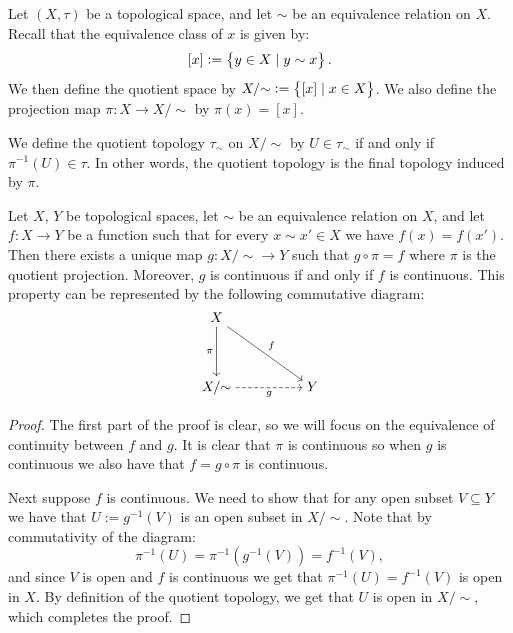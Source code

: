 \documentclass[11pt,a4paper]{article}
\begin{document}
\begin{definition}
  Let $(X, \tau)$ be a topological space, and let $\sim$ be an equivalence
  relation on $X$.
  Recall that the equivalence class of $x$ is given by:
  \[
    [x] := \left\{y \in X \mid y \sim x\right\}.
  \]
  We then define the quotient space by $X/{\sim} := \left\{[x] \mid x \in X\right\}$.
  We also define the projection map $\pi \colon X \to {X}/{\sim}$ by
  $\pi(x) = [x]$.
\end{definition}

\begin{definition}
  We define the quotient topology $\tau_{\sim}$ on ${X} / {\sim}$
  by $U \in \tau_{\sim}$ if and only if $\pi^{-1}(U) \in \tau$.
  In other words, the quotient topology is the final topology induced by $\pi$.
\end{definition}

\begin{proposition}
  Let $X$, $Y$ be topological spaces, let $\sim$ be an equivalence relation
  on $X$, and let $f \colon X \to Y$ be a function such that for every 
  $x \sim x' \in X$ we have $f(x) = f(x')$.
  Then there exists a unique map $g \colon {X}/{\sim} \to Y$ such that
  $g \circ \pi = f$ where $\pi$ is the quotient projection.
  Moreover, $g$ is continuous if and only if $f$ is continuous.
  This property can be represented by the following
  commutative diagram:
  \[\begin{tikzcd}[ampersand replacement=\&,cramped]
    X \\
    \\
    {X/{\sim}} \&\& Y
    \arrow["\pi"', from=1-1, to=3-1]
    \arrow["f", from=1-1, to=3-3]
    \arrow["{g}"', dashed, from=3-1, to=3-3]
  \end{tikzcd}\]
\end{proposition}
\begin{proof}
  The first part of the proof is clear, so we will focus on the equivalence
  of continuity between $f$ and $g$.
  It is clear that $\pi$ is continuous so when $g$ is continuous
  we also have that $f = g \circ \pi$ is continuous.

  Next suppose $f$ is continuous.
  We need to show that for any open subset $V \subseteq Y$
  we have that $U := g^{-1}(V)$ is an open subset in $X/{\sim}$.
  Note that by commutativity of the diagram:
  \[
    \pi^{-1}(U) =
    \pi^{-1}(g^{-1}(V)) =
    f^{-1}(V),
  \]
  and since $V$ is open and $f$ is continuous we get that
  $\pi^{-1}(U) = f^{-1}(V)$ is open in $X$.
  By definition of the quotient topology,
  we get that $U$ is open in $X/{\sim}$, which completes the proof.
\end{proof}
\end{document}
